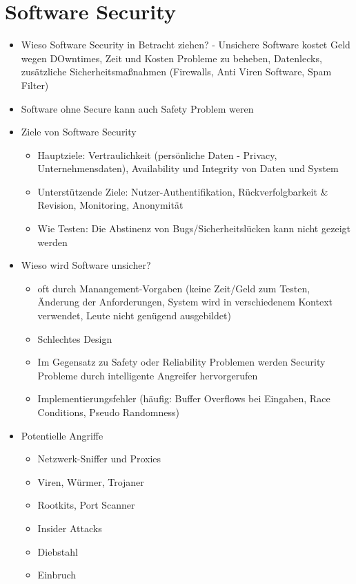 \documentclass[paper=a4, fontsize=11pt]{scrartcl} %
\numberwithin{equation}{section} %
\numberwithin{figure}{section} %
\numberwithin{table}{section} %
\begin{document}
\section{Software Security}

\begin{itemize}
  \item Wieso Software Security in Betracht ziehen? - Unsichere Software kostet Geld wegen DOwntimes, Zeit und Kosten Probleme zu beheben, Datenlecks, zusätzliche Sicherheitsmaßnahmen (Firewalls, Anti Viren Software, Spam Filter)
  \item Software ohne Secure kann auch Safety Problem weren
  \item Ziele von Software Security
  \begin{itemize}
    \item Hauptziele: Vertraulichkeit (persönliche Daten - Privacy, Unternehmensdaten), Availability und Integrity von Daten und System
    \item Unterstützende Ziele: Nutzer-Authentifikation, Rückverfolgbarkeit \& Revision, Monitoring, Anonymität
    \item Wie Testen: Die Abstinenz von Bugs/Sicherheitslücken kann nicht gezeigt werden
  \end{itemize}
  \item Wieso wird Software unsicher?
  \begin{itemize}
    \item oft durch Manangement-Vorgaben (keine Zeit/Geld zum Testen, Änderung der Anforderungen, System wird in verschiedenem Kontext verwendet, Leute nicht genügend ausgebildet)
    \item Schlechtes Design
    \item Im Gegensatz zu Safety oder Reliability Problemen werden Security Probleme durch intelligente Angreifer hervorgerufen
    \item Implementierungsfehler (häufig: Buffer Overflows bei Eingaben, Race Conditions, Pseudo Randomness)
  \end{itemize}
  \item Potentielle Angriffe
  \begin{itemize}
    \item Netzwerk-Sniffer und Proxies
    \item Viren, Würmer, Trojaner
    \item Rootkits, Port Scanner
    \item Insider Attacks
    \item Diebstahl
    \item Einbruch

\end{itemize}
\end{itemize}
\end{document}
